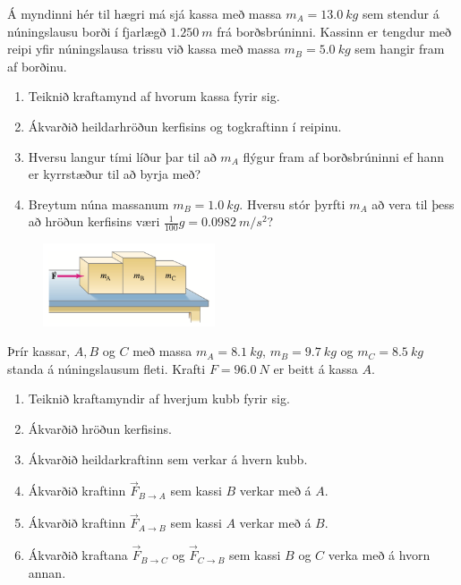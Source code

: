 \begin{enumerate}[label = \textbf{Dæmi \thechapter.\arabic*.}]
\begin{minipage}{\linewidth}
\item Á myndinni hér til hægri má sjá kassa með massa $m_A = \SI{13.0}{kg}$ sem stendur á núningslausu borði í fjarlægð $\SI{1.250}{m}$ frá borðsbrúninni. Kassinn er tengdur með reipi yfir núningslausa trissu við kassa með massa $m_B = \SI{5.0}{kg}$ sem hangir fram af borðinu.
\begin{enumerate}[label = \textbf{(\alph*)}]
    \item Teiknið kraftamynd af hvorum kassa fyrir sig.
    \item Ákvarðið heildarhröðun kerfisins og togkraftinn í reipinu.
    \item Hversu langur tími líður þar til að $m_A$ flýgur fram af borðsbrúninni ef hann er kyrrstæður til að byrja með?
    \item Breytum núna massanum $m_B = \SI{1.0}{kg}$. Hversu stór þyrfti $m_A$ að vera til þess að hröðun kerfisins væri $\frac{1}{100}g = \SI{0.0982}{m/s^2}$?
\end{enumerate}

\end{minipage}

\begin{minipage}{\linewidth}
\begin{figure}
\includegraphics[width=2in]{images/3kubbar.png}
\end{figure}

\item Þrír kassar, $A,B$ og $C$ með massa $m_A = \SI{8.1}{kg}$, $m_B = \SI{9.7}{kg}$ og $m_C = \SI{8.5}{kg}$ standa á núningslausum fleti. Krafti $F = \SI{96.0}{N}$ er beitt á kassa $A$.
\begin{enumerate}[label = \textbf{(\alph*)}]
    \item Teiknið kraftamyndir af hverjum kubb fyrir sig.
    \item Ákvarðið hröðun kerfisins.
    \item Ákvarðið heildarkraftinn sem verkar á hvern kubb.
    \item Ákvarðið kraftinn $\vec{F}_{B \to A}$ sem kassi $B$ verkar með á $A$.
    \item Ákvarðið kraftinn $\vec{F}_{A \to B}$ sem kassi $A$ verkar með á $B$.
    \item Ákvarðið kraftana $\vec{F}_{B \to C}$ og $\vec{F}_{C \to B}$ sem kassi $B$ og $C$ verka með á hvorn annan.
\end{enumerate}


\end{minipage}
\end{enumerate}
